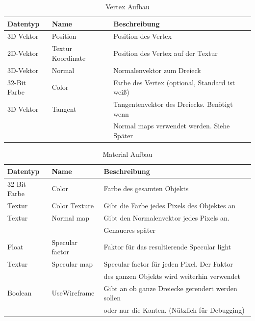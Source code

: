 \begin{table}
	\caption{Vertex Aufbau}
	\centering
	\begin{tabular}{lll}\toprule[1.5pt]
		Datentyp & Name & Beschreibung \\\midrule
		3D-Vektor & Position & Position des Vertex \\
		2D-Vektor & Textur Koordinate & Position des Vertex auf der Textur \\
		3D-Vektor & Normal & Normalenvektor zum Dreieck \\
		32-Bit Farbe & Color & Farbe des Vertex (optional, Standard ist weiß) \\
		3D-Vektor & Tangent & Tangentenvektor des Dreiecks. Benötigt wenn \\
		 & & Normal maps verwendet werden. Siehe Später\\\bottomrule[1.5pt]
	\end{tabular}
\end{table}
\begin{table}
	\caption{Material Aufbau}
	\centering
	\begin{tabular}{lll}\toprule[1.5pt]
	Datentyp & Name & Beschreibung \\\midrule
	32-Bit Farbe & Color & Farbe des gesamten Objekts \\
	Textur & Color Texture & Gibt die Farbe jedes Pixels des Objektes an \\
	Textur & Normal map & Gibt den Normalenvektor jedes Pixels an. \\
	 & & Genaueres später \\
	Float & Specular factor & Faktor für das resultierende Specular light \\
	Textur & Specular map & Specular factor für jeden Pixel. Der Faktor \\
	 & & des ganzen Objekts wird weiterhin verwendet \\
	 Boolean & UseWireframe & Gibt an ob ganze Dreiecke gerendert werden sollen\\
	  & & oder nur die Kanten. (Nützlich für Debugging)\\\bottomrule[1.5pt]
\end{tabular}
\end{table}


